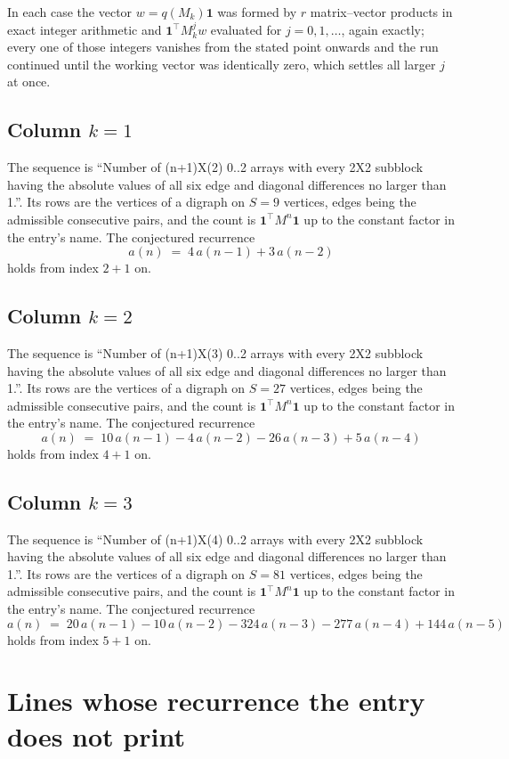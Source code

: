 \documentclass[11pt,a4paper]{article}
\theoremstyle{plain}
\theoremstyle{definition}
\begin{document}
In each case the vector $w=q(M_k)\mathbf{1}$ was formed by $r$ matrix--vector products in
exact integer arithmetic and $\mathbf{1}^{\!\top}M_k^{j}w$ evaluated for $j=0,1,\dots$,
again exactly; every one of those integers vanishes from the stated point onwards and the run
continued until the working vector was identically zero, which settles all larger $j$ at once.

\subsection*{Column $k$$=1$}
The sequence is ``Number of (n+1)X(2) 0..2 arrays with every 2X2 subblock having the absolute values of all six edge and diagonal differences no larger than 1.''. Its rows are the vertices of a digraph on
$S=9$ vertices, edges being the admissible consecutive pairs, and the count is
$\mathbf{1}^{\!\top}M^{n}\mathbf{1}$ up to the constant factor in the entry's name.
The conjectured recurrence
\[
a(n)\;=\;4\,a(n-1) + 3\,a(n-2)
\]
holds from index $2+1$ on.

\subsection*{Column $k$$=2$}
The sequence is ``Number of (n+1)X(3) 0..2 arrays with every 2X2 subblock having the absolute values of all six edge and diagonal differences no larger than 1.''. Its rows are the vertices of a digraph on
$S=27$ vertices, edges being the admissible consecutive pairs, and the count is
$\mathbf{1}^{\!\top}M^{n}\mathbf{1}$ up to the constant factor in the entry's name.
The conjectured recurrence
\[
a(n)\;=\;10\,a(n-1) - 4\,a(n-2) - 26\,a(n-3) + 5\,a(n-4)
\]
holds from index $4+1$ on.

\subsection*{Column $k$$=3$}
The sequence is ``Number of (n+1)X(4) 0..2 arrays with every 2X2 subblock having the absolute values of all six edge and diagonal differences no larger than 1.''. Its rows are the vertices of a digraph on
$S=81$ vertices, edges being the admissible consecutive pairs, and the count is
$\mathbf{1}^{\!\top}M^{n}\mathbf{1}$ up to the constant factor in the entry's name.
The conjectured recurrence
\[
a(n)\;=\;20\,a(n-1) - 10\,a(n-2) - 324\,a(n-3) - 277\,a(n-4) + 144\,a(n-5)
\]
holds from index $5+1$ on.


\section{Lines whose recurrence the entry does not print}
\end{document}
